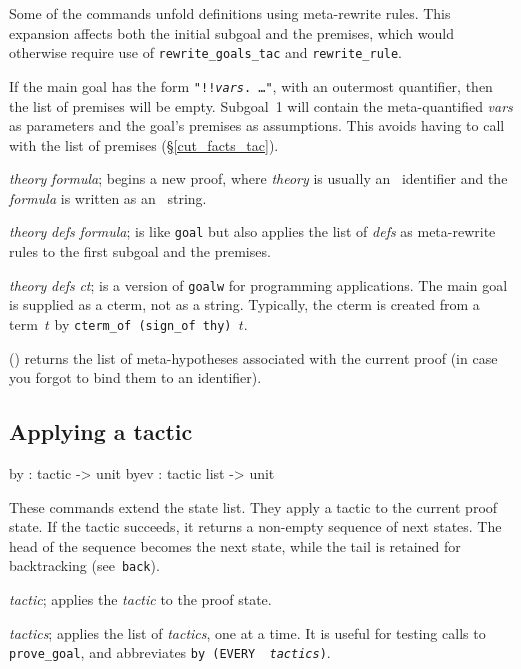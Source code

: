 Some of the commands unfold definitions using meta-rewrite rules.  This
expansion affects both the initial subgoal and the premises, which would
otherwise require use of {\tt rewrite_goals_tac} and
{\tt rewrite_rule}.

If the main goal has the form {\tt"!!{\it vars}.\ \ldots"}, with an
outermost quantifier, then the list of premises will be empty.  Subgoal~1
will contain the meta-quantified {\it vars\/} as parameters and the goal's
premises as assumptions.  This avoids having to call
 with the list of premises (\S\ref{cut_facts_tac}).

\begin{ttdescription}
\item[\ttindexbold{goal} {\it theory} {\it formula};] 
begins a new proof, where {\it theory} is usually an \ML\ identifier
and the {\it formula\/} is written as an \ML\ string.

\item[\ttindexbold{goalw} {\it theory} {\it defs} {\it formula};] 
is like {\tt goal} but also applies the list of {\it defs\/} as
meta-rewrite rules to the first subgoal and the premises.

\item[\ttindexbold{goalw_cterm} {\it theory} {\it defs} {\it ct};] is
  a version of {\tt goalw} for programming applications.  The main
  goal is supplied as a cterm, not as a string.  Typically, the cterm
  is created from a term~$t$ by \hbox{\tt cterm_of (sign_of thy) $t$}.

\item[\ttindexbold{premises}()] 
returns the list of meta-hypotheses associated with the current proof (in
case you forgot to bind them to an \ML{} identifier).
\end{ttdescription}


\subsection{Applying a tactic}
\begin{ttbox} 
by   : tactic -> unit
byev : tactic list -> unit
\end{ttbox}
These commands extend the state list.  They apply a tactic to the current
proof state.  If the tactic succeeds, it returns a non-empty sequence of
next states.  The head of the sequence becomes the next state, while the
tail is retained for backtracking (see~{\tt back}).
\begin{ttdescription} \item[\ttindexbold{by} {\it tactic};] 
applies the {\it tactic\/} to the proof state.

\item[\ttindexbold{byev} {\it tactics};] 
applies the list of {\it tactics}, one at a time.  It is useful for testing
calls to {\tt prove_goal}, and abbreviates \hbox{\tt by (EVERY {\it
tactics})}.
\end{ttdescription}

